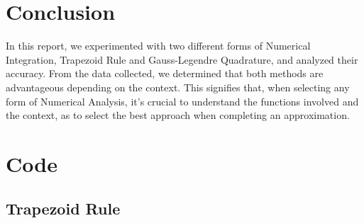 \documentclass[12pt]{article}
\begin{document}
\section{Conclusion}
In this report, we experimented with two different forms of Numerical Integration,
Trapezoid Rule and Gauss-Legendre Quadrature, and analyzed their accuracy. From the data collected, we determined that
both methods are advantageous depending on the context. This signifies that, when selecting any form of Numerical Analysis,
it's crucial to understand the functions involved and the context, as to select the best approach when completing an
approximation. 

\section{Code}

\subsection{Trapezoid Rule}\label{trap_code}
\end{document}
